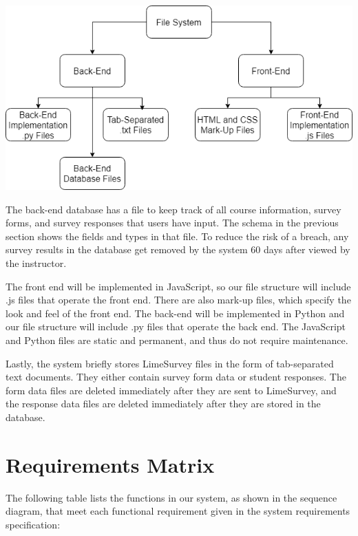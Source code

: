\documentclass{article}
\begin{document}
\newpage
\begin{center}
\label{fig:filediagram}
{\includegraphics[scale=.64]{images/file_structure_diagram.png}} 
\end{center}

\vspace{3mm}

The back-end database has a file to keep track of all course information, survey forms, and survey responses that users have input. The schema in the previous section shows the fields and types in that file. To reduce the risk of a breach, any survey results in the database get removed by the system 60 days after viewed by the instructor. 

The front end will be implemented in JavaScript, so our file structure will include .js files that operate the front end. There are also mark-up files, which specify the look and feel of the front end. The back-end will be implemented in Python and our file structure will include .py files that operate the back end. The JavaScript and Python files are static and permanent, and thus do not require maintenance.

Lastly, the system briefly stores LimeSurvey files in the form of tab-separated text documents. They either contain survey form data or student responses. The form data files are deleted immediately after they are sent to LimeSurvey, and the response data files are deleted immediately after they are stored in the database.

\section{Requirements Matrix}

The following table lists the functions in our system, as shown in the sequence diagram, that meet each functional requirement given in the system requirements specification:
\end{document}
